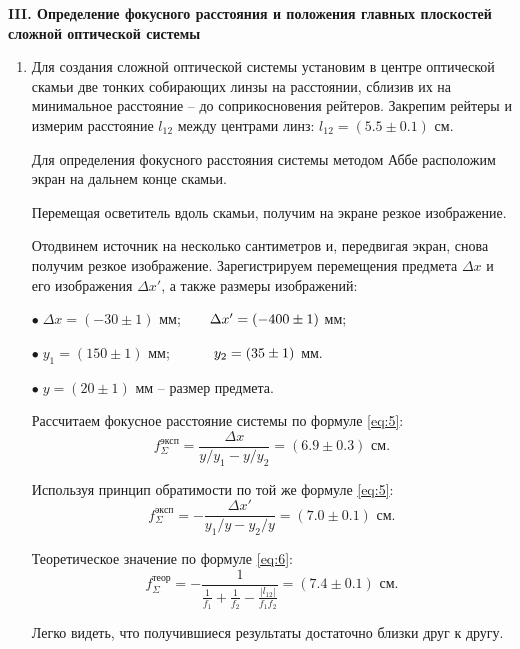 \documentclass[12pt,a4paper]{article}
\begin{document}
	\begin{center}
		\textbf{III. Определение фокусного расстояния и положения главных плоскостей сложной оптической системы}
	\end{center}

	\begin{enumerate}
		\item Для создания сложной оптической системы установим в центре оптической скамьи две тонких собирающих линзы на расстоянии, сблизив их на минимальное расстояние -- до соприкосновения рейтеров. Закрепим рейтеры и измерим расстояние $l_{12}$ между центрами линз: $l_{12} = (5.5 \pm 0.1)$ см.
		
		Для определения фокусного расстояния системы методом Аббе расположим экран на дальнем конце скамьи.
		
		Перемещая осветитель вдоль скамьи, получим на экране резкое изображение. 
		
		Отодвинем источник на несколько сантиметров и, передвигая экран, снова получим резкое изображение. Зарегистрируем перемещения предмета $\Delta x$ и его изображения $\Delta x'$, а также размеры изображений:
		
		$\bullet \;\Delta x = (-30 \pm 1)$ мм; $\hspace{6mm} \Delta x' = (-400 \pm 1)$ мм;
		
		$\bullet \;y_1 = (150 \pm 1)$ мм;  $\hspace{10mm} y_2 = (35 \pm 1)$ мм.
		
		$\bullet \;y = (20 \pm 1)$ мм -- размер предмета.
		
		Рассчитаем фокусное расстояние системы по формуле \ref{eq:5}:
		\begin{equation*}
			f_\Sigma^\text{эксп} = \frac{\Delta x}{y/y_1 - y/y_2} = (6.9 \pm 0.3) \text{ см}.
		\end{equation*}

        Используя принцип обратимости по той же формуле \ref{eq:5}:
		\begin{equation*}
			f_\Sigma^\text{эксп} = -\frac{\Delta x'}{y_1/y - y_2/y} = (7.0 \pm 0.1) \text{ см}.
		\end{equation*}

        Теоретическое значение по формуле \ref{eq:6}:
		\begin{equation*}
			f_\Sigma^\text{теор} = -\frac{1}{\frac{1}{f_1} + \frac{1}{f_2} - \frac{|l_{12}|}{f_1f_2}} = (7.4 \pm 0.1) \text{ см}.
		\end{equation*}
		
		Легко видеть, что получившиеся результаты достаточно близки друг к другу.
		

\end{enumerate}
\end{document}

